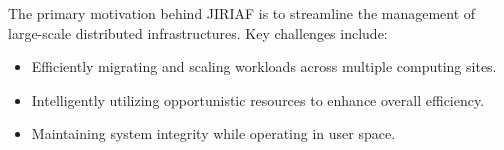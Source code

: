 The primary motivation behind JIRIAF is to streamline the management of large-scale distributed infrastructures. Key challenges include:
\begin{itemize}
    \item Efficiently migrating and scaling workloads across multiple computing sites.
    \item Intelligently utilizing opportunistic resources to enhance overall efficiency.
    \item Maintaining system integrity while operating in user space.
\end{itemize}
